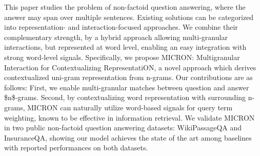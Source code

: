 This paper studies the problem of non-factoid question answering, where the answer may span over multiple sentences. 
Existing solutions can be categorized into representation- and interaction-focused approaches.
We combine their complementary strength, by a hybrid approach allowing multi-granular interactions, but represented at word level, enabling an easy integration with strong word-level signals.
Specifically, we propose MICRON: Multigranular Interaction for Contextualizing RepresentatiON, a novel approach which derives contextualized uni-gram representation from n-grams. 
Our contributions are as follows:
First, we enable multi-granular matches between question and answer \$n\$-grams.
Second, by contextualizing word representation with surrounding n-grams, 
MICRON can naturally utilize word-based signals for query term weighting, known to be effective in information retrieval.
We validate MICRON in two public non-factoid question answering datasets: WikiPassageQA and InsuranceQA, showing our model achieves the state of the art among baselines with reported performances on both datasets.